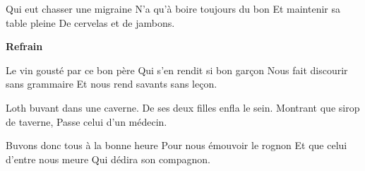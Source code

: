 \footnotemark [
ititle={Chanson à boire}]


\beginverse
Qui eut chasser une migraine
N'a qu'à boire toujours du bon
Et maintenir sa table pleine
De cervelas et de jambons.
\endverse

\beginchorus
\textbf{Refrain}
\endchorus

\beginverse
Le vin gousté par ce bon père
Qui s'en rendit si bon garçon
Nous fait discourir sans grammaire
Et nous rend savants sans leçon.
\endverse

\beginverse
Loth buvant dans une caverne.
De ses deux filles enfla le sein.
Montrant que sirop de taverne,
Passe celui d'un médecin.
\endverse

\beginverse
Buvons donc tous à la bonne heure 
Pour nous émouvoir le rognon
Et que celui d'entre nous meure
Qui dédira son compagnon.
\endverse
\endsong